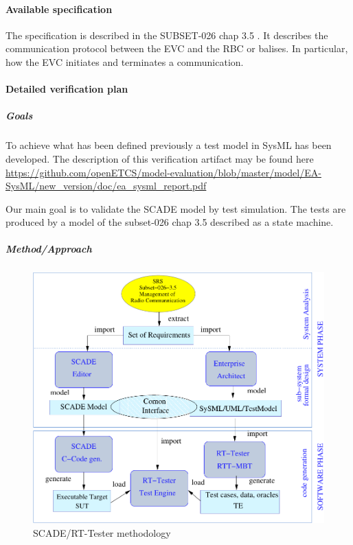 \documentclass{article}
\begin{document}
\paragraph{Available specification}

The specification is described in the
SUBSET-026\cite{unisig_subset-026_2012} chap 3.5 \cite{chap3-5}. It
describes the communication protocol between the EVC and the RBC or
balises. In particular, how the EVC initiates and terminates a
communication.



\paragraph{Detailed verification plan}

\subparagraph{Goals}

To achieve what has been defined previously a test model in SysML has
been developed. The description of this verification artifact may be
found here \url{https://github.com/openETCS/model-evaluation/blob/master/model/EA-SysML/new_version/doc/ea_sysml_report.pdf}

Our main goal is to validate the SCADE model by test simulation. The
tests are produced by a model of the subset-026 chap 3.5 described as a
state machine.

\subparagraph{Method/Approach}

\begin{figure}
\includegraphics[width=\textwidth]{framework}
\caption{\label{fig:method}SCADE/RT-Tester methodology}
\end{figure}
\end{document}
